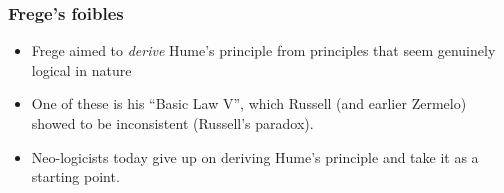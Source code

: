 \begin{frame}
\frametitle{Frege's foibles}

\begin{itemize}[<+->]

\item Frege aimed to \textit{derive} Hume's principle from principles that seem genuinely logical in nature

\item One of these is his ``Basic Law V'', which Russell (and earlier Zermelo) showed to be inconsistent (Russell's paradox). 

\item Neo-logicists today give up on deriving Hume's principle and take it as a starting point. 


\end{itemize}
\end{frame}



